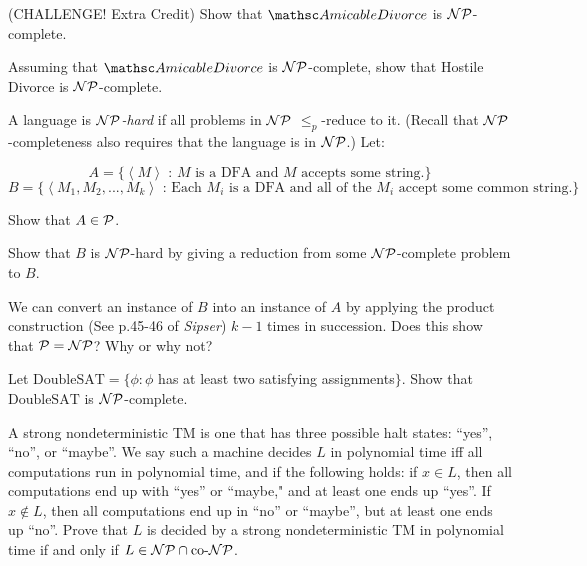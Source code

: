 \documentclass[solution, letterpaper]{cscie121}
\begin{document}
\subproblem (CHALLENGE! Extra Credit) Show that $\AD$ is ${\cal NP}$-complete.

\subproblem Assuming that $\AD$ is ${\cal NP}$-complete, show that {\sc Hostile Divorce} is ${\cal NP}$-complete.

\begin{solution}
\end{solution}

       
 A language is ${\cal NP}${\em -hard} if all
problems in ${\cal NP}$ $\le_p$-reduce to it. (Recall that ${\cal NP}$-completeness also requires that the language is in ${\cal NP}$.) Let:

$$A=\{\left<M\right>\text{ : $M$ is a DFA and $M$ accepts some string.}\}$$
$$B=\{\left<M_1,M_2,...,M_k\right>\text{ : Each $M_i$ is a DFA and
all of the $M_i$ accept some common string.} \}$$

\subproblem Show that $A \in {\cal P}$.

\subproblem Show that $B$ is ${\cal NP}$-hard by giving a reduction from
some ${\cal NP}$-complete problem to $B$.

\subproblem We can convert an instance of $B$ into an instance of
$A$ by applying the product construction (See p.45-46 of {\em
Sipser}) $k-1$ times in succession. Does this show that ${\cal P} = {\cal NP}$? Why
or why not?

\begin{solution}
\end{solution}

Let $\text{DoubleSAT} = \{ \phi: \phi$ has at least two satisfying
assignments$\}$. Show that $\text{DoubleSAT}$ is ${\cal NP}$-complete.


\begin{solution}
\end{solution}
        
        

\newcommand{\CoNP}{ \text{co-}{\cal NP}}
A strong nondeterministic TM is one that has three possible
halt states:  ``yes'', ``no'', or ``maybe''.  We say such a machine decides $L$ in
polynomial time iff all computations run in polynomial time, and if the
following holds: if $x\in L$, then all computations end up with ``yes'' or
``maybe," and at least one ends up ``yes''.  If $x\notin L$, then all
computations end up in ``no'' or ``maybe'', but at least one ends up ``no''.
Prove that $L$ is decided by a strong nondeterministic TM in polynomial time
if and only if $L\in{\cal NP}\cap\CoNP$.

\begin{solution}
\end{solution}
\end{document}
